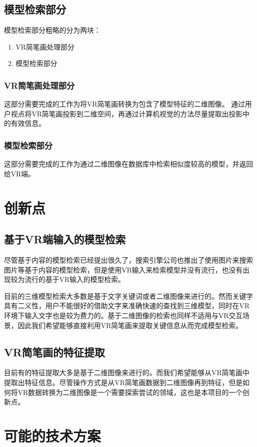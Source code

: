 \documentclass{article}
\begin{document}
\subsection{模型检索部分}
模型检索部分粗略的分为两块：
\begin{enumerate}
    \item VR简笔画处理部分
    \item 模型检索部分
\end{enumerate}

\subsubsection{VR简笔画处理部分}
这部分需要完成的工作为将VR简笔画转换为包含了模型特征的二维图像。 
通过用户视点将VR简笔画投影到二维空间，再通过计算机视觉的方法尽量提取出投影中的有效信息。

\subsubsection{模型检索部分}
这部分需要完成的工作为通过二维图像在数据库中检索相似度较高的模型，并返回给VR端。


\section{创新点}
\subsection{基于VR端输入的模型检索}
尽管基于内容的模型检索已经提出很久了，搜索引擎公司也推出了使用图片来搜索图片等基于内容的模型检索，但是使用VR输入来检索模型并没有流行，也没有出现较为流行的基于VR输入的模型检索。  

目前的三维模型检索大多数是基于文字关键词或者二维图像来进行的。然而关键字具有二义性，用户不能很好的借助文字来准确快速的查找到三维模型，同时在VR环境下输入文字也是较为费力的。基于二维图像的检索也同样不适用与VR交互场景，因此我们希望能够直接利用VR简笔画来提取关键信息从而完成模型检索。

\subsection{VR简笔画的特征提取}
目前有的特征提取大多是基于二维图像来进行的。而我们希望能够从VR简笔画中提取出特征信息。尽管操作方式是从VR简笔画数据到二维图像再到特征，但是如何将VR数据转换为二维图像是一个需要探索尝试的领域，这也是本项目的一个创新点。  


\section{可能的技术方案}
\end{document}
